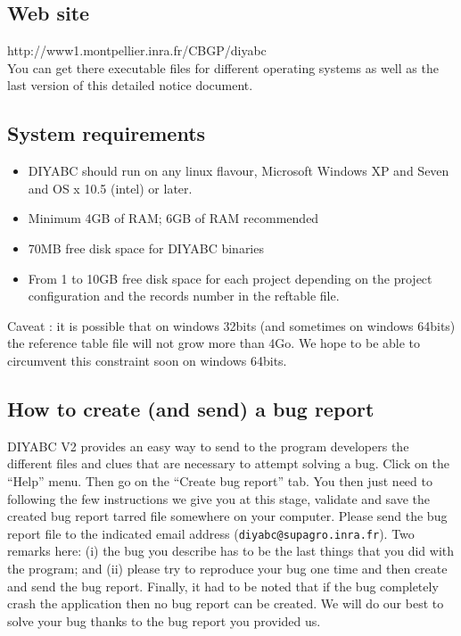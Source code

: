 \documentclass [a4paper]{report}
\let\subsectionv\subsection
\renewcommand{\subsection}[1]{\subsectionv{#1} \setcounter{paragraph}{0}}
\begin{document}
\subsection{Web site}
http://www1.montpellier.inra.fr/CBGP/diyabc\\
You can get there executable files for different operating systems as well as the last version of this detailed notice document.



\subsection{System requirements}
\begin{itemize}
\item DIYABC should run on any linux flavour, Microsoft Windows XP and Seven and OS x 10.5 (intel) or later.
\item Minimum 4GB of RAM; 6GB of RAM recommended 
\item 70MB free disk space for DIYABC binaries
\item From 1 to 10GB free disk space for each project depending on the project configuration and the records number in the reftable file.
\end{itemize}

Caveat : it is possible that on windows 32bits (and sometimes on windows 64bits) the reference table file will not grow more than 4Go. We hope to be able to circumvent this constraint soon on windows 64bits.

\subsection{How to create (and send) a bug report}
DIYABC V2 provides an easy way to send to the program developers the different files and clues that are necessary to attempt solving a bug. Click on the “Help” menu. Then go on the “Create bug report” tab. You then just need to following the few instructions we give you at this stage, validate and save the created bug report tarred file somewhere on your computer. Please send the bug report file to the indicated email address (\texttt{diyabc@supagro.inra.fr}). Two remarks here: (i) the bug you describe has to be the last things that you did with the program; and (ii) please try to reproduce your bug one time and then create and send the bug report. Finally, it had to be noted that if the bug completely crash the application then no bug report can be created. We will do our best to solve your bug thanks to the bug report you provided us.
\end{document}
